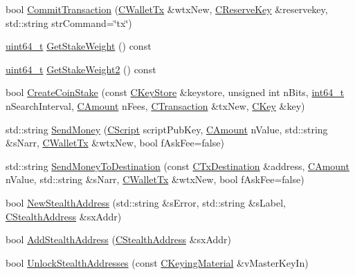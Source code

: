 \begin{DoxyCompactItemize}
\item 
bool \hyperlink{class_c_wallet_aa13fbeaebd271f910a54cc5b82d73fde}{Commit\+Transaction} (\hyperlink{class_c_wallet_tx}{C\+Wallet\+Tx} \&wtx\+New, \hyperlink{class_c_reserve_key}{C\+Reserve\+Key} \&reservekey, std\+::string str\+Command=\char`\"{}tx\char`\"{})
\item 
\hyperlink{stdint_8h_aaa5d1cd013383c889537491c3cfd9aad}{uint64\+\_\+t} \hyperlink{class_c_wallet_a8fe028fa266ab65464992b829861a627}{Get\+Stake\+Weight} () const 
\item 
\hyperlink{stdint_8h_aaa5d1cd013383c889537491c3cfd9aad}{uint64\+\_\+t} \hyperlink{class_c_wallet_ae1f7ae1ed114ca0873ed089e163b3ba5}{Get\+Stake\+Weight2} () const 
\item 
bool \hyperlink{class_c_wallet_a644df129468440aa36f49ca3716a3c19}{Create\+Coin\+Stake} (const \hyperlink{class_c_key_store}{C\+Key\+Store} \&keystore, unsigned int n\+Bits, \hyperlink{stdint_8h_adec1df1b8b51cb32b77e5b86fff46471}{int64\+\_\+t} n\+Search\+Interval, \hyperlink{amount_8h_a4eaf3a5239714d8c45b851527f7cb564}{C\+Amount} n\+Fees, \hyperlink{class_c_transaction}{C\+Transaction} \&tx\+New, \hyperlink{class_c_key}{C\+Key} \&key)
\item 
std\+::string \hyperlink{class_c_wallet_a356d16f6df1f109674adf1d1dc577f2e}{Send\+Money} (\hyperlink{class_c_script}{C\+Script} script\+Pub\+Key, \hyperlink{amount_8h_a4eaf3a5239714d8c45b851527f7cb564}{C\+Amount} n\+Value, std\+::string \&s\+Narr, \hyperlink{class_c_wallet_tx}{C\+Wallet\+Tx} \&wtx\+New, bool f\+Ask\+Fee=false)
\item 
std\+::string \hyperlink{class_c_wallet_aad5d55fc472f6b9ccbec5af0a7246d60}{Send\+Money\+To\+Destination} (const \hyperlink{keystore_8h_a8f46ecba0ddeb036be6b58d6ed1909cd}{C\+Tx\+Destination} \&address, \hyperlink{amount_8h_a4eaf3a5239714d8c45b851527f7cb564}{C\+Amount} n\+Value, std\+::string \&s\+Narr, \hyperlink{class_c_wallet_tx}{C\+Wallet\+Tx} \&wtx\+New, bool f\+Ask\+Fee=false)
\item 
bool \hyperlink{class_c_wallet_ae3bb56ad5d165525e45e4a0c9ad034f2}{New\+Stealth\+Address} (std\+::string \&s\+Error, std\+::string \&s\+Label, \hyperlink{class_c_stealth_address}{C\+Stealth\+Address} \&sx\+Addr)
\item 
bool \hyperlink{class_c_wallet_a19d6a23e37ff619c741b7dfa9279b973}{Add\+Stealth\+Address} (\hyperlink{class_c_stealth_address}{C\+Stealth\+Address} \&sx\+Addr)
\item 
bool \hyperlink{class_c_wallet_ac45af0632ea59c56295d3158b7387f33}{Unlock\+Stealth\+Addresses} (const \hyperlink{crypter_8h_a64709c9a3acc8f5694515789a183ad7b}{C\+Keying\+Material} \&v\+Master\+Key\+In)

\end{DoxyCompactItemize}
